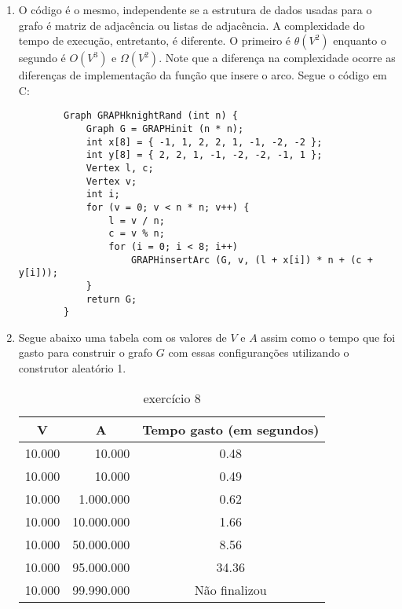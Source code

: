 \documentclass[12pt,letterpaper]{article}
\begin{document}
\begin{enumerate}
    \item O código é o mesmo, independente se a estrutura de dados usadas para o grafo é matriz de adjacência ou listas de adjacência. A complexidade do tempo de execução, entretanto, é diferente. O primeiro é $\theta(V^2)$ enquanto o segundo é $O(V^3)$ e $\Omega(V^2)$. Note que a diferença na complexidade ocorre as diferenças de implementação da função que insere o arco. Segue o código em C:
    \begin{lstlisting}
        Graph GRAPHknightRand (int n) {
            Graph G = GRAPHinit (n * n);
            int x[8] = { -1, 1, 2, 2, 1, -1, -2, -2 };
            int y[8] = { 2, 2, 1, -1, -2, -2, -1, 1 };
            Vertex l, c;
            Vertex v;
            int i;
            for (v = 0; v < n * n; v++) {
                l = v / n;
                c = v % n;
                for (i = 0; i < 8; i++)
                    GRAPHinsertArc (G, v, (l + x[i]) * n + (c + y[i]));
            }
            return G;
        }
    \end{lstlisting}
    
    \item Segue abaixo uma tabela com os valores de $V$ e $A$ assim como o tempo que foi gasto para construir o grafo $G$ com essas configuranções utilizando o construtor aleatório 1.
    
    \begin{table}[H]
    \centering
    \caption{exercício 8}
    \label{my-label}
    \begin{tabular}{rrc}
    \hline
    \multicolumn{1}{c}{\textbf{V}} & \multicolumn{1}{c}{\textbf{A}} & \textbf{Tempo gasto (em segundos)} \\ \hline
    10.000                         & 10.000                         & 0.48                               \\ \hline
    10.000                         & 10.000                         & 0.49                               \\ \hline
    10.000                         & 1.000.000                      & 0.62                               \\ \hline
    10.000                         & 10.000.000                     & 1.66                               \\ \hline
    10.000                         & 50.000.000                     & 8.56                               \\ \hline
    10.000                         & 95.000.000                     & 34.36                              \\ \hline
    10.000                         & 99.990.000                     & Não finalizou                                   \\ \hline
    \end{tabular}
    \end{table}
    

\end{enumerate}
\end{document}
